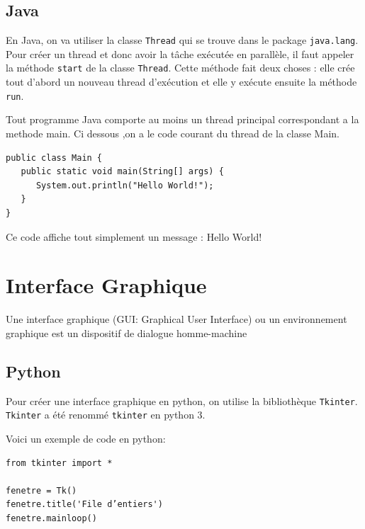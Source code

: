 \documentclass{article}
\begin{document}
\subsection{Java}

En Java, on va utiliser la classe \verb|Thread| qui se trouve dans le package \verb|java.lang|.
Pour créer un thread et donc avoir la tâche exécutée en parallèle, il faut appeler la méthode \verb|start| de la classe \verb|Thread|. Cette méthode fait deux choses : elle crée tout d'abord un nouveau thread d'exécution et elle y exécute ensuite la méthode \verb|run|.





Tout programme Java comporte au moins un thread principal correspondant a la methode main. 
Ci dessous ,on a le code courant du thread de la classe Main.

\begin{verbatim}
public class Main {
   public static void main(String[] args) {
      System.out.println("Hello World!");
   }
}
\end{verbatim}
Ce code affiche tout simplement un message : Hello World!

\section{Interface Graphique }

Une interface graphique (GUI: Graphical User Interface) ou un environnement graphique est un dispositif de dialogue homme-machine

\subsection{Python}

Pour créer une interface graphique en python, on utilise la bibliothèque \verb|Tkinter|.
\verb|Tkinter| a été renommé \verb|tkinter| en python 3.

\bigskip Voici un exemple de code en python:
\begin{verbatim} 
from tkinter import *

fenetre = Tk()
fenetre.title('File d’entiers')
fenetre.mainloop()
\end{verbatim}

\begin{center} \end{center}
\end{document}
